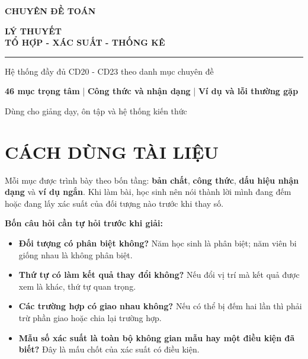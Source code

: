 \documentclass[12pt,a4paper]{article}
\newenvironment{keypoints}{%
  \begin{itemize}[leftmargin=6mm,itemsep=2pt,topsep=3pt]
}{\end{itemize}}
\begin{document}
\color{ink}

\begin{titlepage}
  \thispagestyle{empty}
  \centering
  \vspace*{2.2cm}
  {\sffamily\bfseries\large\color{blue}CHUYÊN ĐỀ TOÁN\par}
  \vspace{0.6cm}
  {\sffamily\bfseries\fontsize{25}{31}\selectfont\color{navy}
    LÝ THUYẾT\\[2mm]TỔ HỢP - XÁC SUẤT - THỐNG KÊ\par}
  \vspace{0.7cm}
  {\color{blue}\rule{0.72\textwidth}{1.3pt}\par}
  \vspace{0.8cm}
  {\large Hệ thống đầy đủ CD20 - CD23 theo danh mục chuyên đề\par}
  \vspace{1cm}
  \begin{tcolorbox}[width=0.88\textwidth,colback=paleblue,colframe=navy,
    borderline west={2pt}{0pt}{navy},arc=0pt]
    \centering
    \textbf{46 mục trọng tâm} \quad | \quad
    \textbf{Công thức và nhận dạng} \quad | \quad
    \textbf{Ví dụ và lỗi thường gặp}
  \end{tcolorbox}
  \vfill
  {\large Dùng cho giảng dạy, ôn tập và hệ thống kiến thức\par}
\end{titlepage}

\section*{CÁCH DÙNG TÀI LIỆU}
Mỗi mục được trình bày theo bốn tầng: \textbf{bản chất}, \textbf{công thức},
\textbf{dấu hiệu nhận dạng} và \textbf{ví dụ ngắn}. Khi làm bài, học sinh nên
nói thành lời mình đang đếm hoặc đang lấy xác suất của đối tượng nào trước khi thay số.

\textbf{Bốn câu hỏi cần tự hỏi trước khi giải:}
\begin{keypoints}
  \item \textbf{Đối tượng có phân biệt không?} Năm học sinh là phân biệt; năm viên bi giống nhau là không phân biệt.
  \item \textbf{Thứ tự có làm kết quả thay đổi không?} Nếu đổi vị trí mà kết quả được xem là khác, thứ tự quan trọng.
  \item \textbf{Các trường hợp có giao nhau không?} Nếu có thể bị đếm hai lần thì phải trừ phần giao hoặc chia lại trường hợp.
  \item \textbf{Mẫu số xác suất là toàn bộ không gian mẫu hay một điều kiện đã biết?} Đây là mấu chốt của xác suất có điều kiện.
\end{keypoints}
\end{document}
